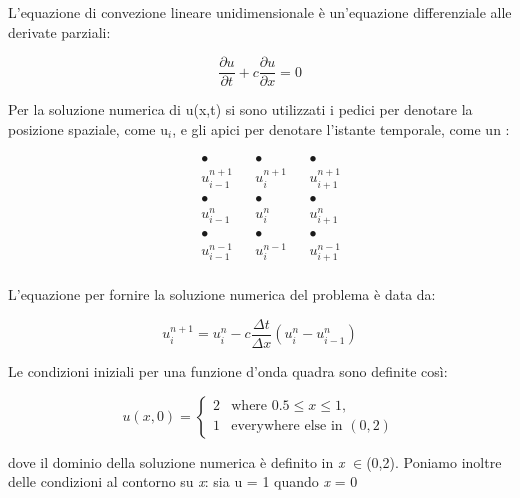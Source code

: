 L’equazione di convezione lineare unidimensionale è un’equazione differenziale alle derivate parziali: 

\begin{equation}
\frac{\partial u}{\partial t} + c \frac{\partial u}{\partial x} = 0
\end{equation}

Per la soluzione numerica di u(x,t) si sono utilizzati i pedici per denotare la posizione spaziale, come u$_i$, e gli apici per denotare l’istante temporale, come un : 

$$
\begin{matrix}
& &\bullet & & \bullet & &  \bullet \\
& &u^{n+1}_{i-1} & & u^{n+1}_i & & u^{n+1}_{i+1} \\
& &\bullet & & \bullet & &  \bullet \\
& &u^n_{i-1} & & u^n_i & & u^n_{i+1} \\
& &\bullet & & \bullet & &  \bullet \\
& &u^{n-1}_{i-1} & & u^{n-1}_i & & u^{n-1}_{i+1} \\
\end{matrix}
$$

L’equazione per fornire la soluzione numerica del problema è data da:

\begin{equation}
u_i^{n+1} = u_i^n - c \frac{\Delta t}{\Delta x}(u_i^n-u_{i-1}^n)
\end{equation}

Le condizioni iniziali per una funzione d’onda quadra sono definite così:

\begin{equation}
u(x,0)=\begin{cases}2 & \text{where } 0.5\leq x \leq 1,\\
1 & \text{everywhere else in } (0, 2)
\end{cases}
\end{equation}

dove il dominio della soluzione numerica è definito in \textit{x} $\in$(0,2).
Poniamo inoltre delle condizioni al contorno su \textit{x}: sia u = 1 quando \textit{x} = 0